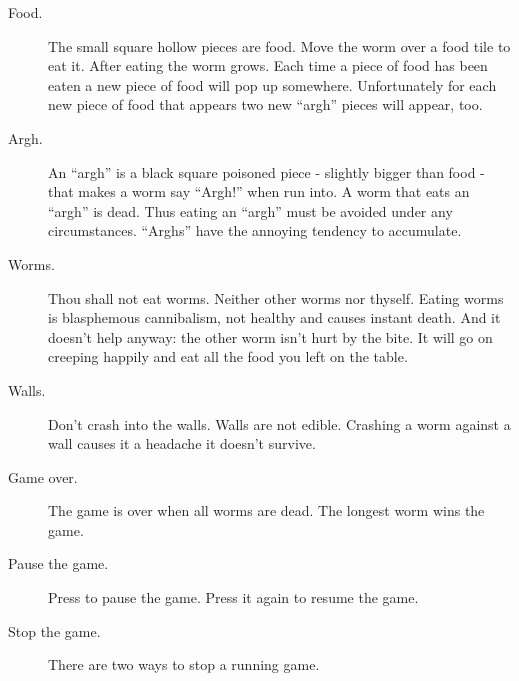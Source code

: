\begin{description}
\item[Food.]
The small square hollow pieces are food. Move the worm over a food tile
to eat it. After eating the worm grows. Each time a piece of food has
been eaten a new piece of food will pop up somewhere. Unfortunately for
each new piece of food that appears two new ``argh'' pieces will
appear, too.
\item[Argh.]
An ``argh'' is a black square poisoned piece {}- slightly bigger than
food {}- that makes a worm say ``Argh!'' when
run into.  A worm that eats an ``argh'' is dead. Thus eating an
``argh'' must be avoided under any circumstances. ``Arghs'' have the
annoying tendency to accumulate.
\item[Worms.]
Thou shall not eat worms. Neither other worms nor thyself. Eating worms
is blasphemous cannibalism, not healthy and causes instant
death. And it doesn't help anyway: the other worm
isn't hurt by the bite. It will go on creeping happily
and eat all the food you left on the table.
\item[Walls.]
Don't crash into the walls. Walls are not edible.
Crashing a worm against a wall causes it a headache it
doesn't survive.
\item[Game over.]
The game is over when all worms are dead. The longest worm wins the
game.
\item [Pause the game.]
Press
%
to pause the game. Press it again to resume the game.

\item[Stop the game.]
There are two ways to stop a running game.


\end{description}
